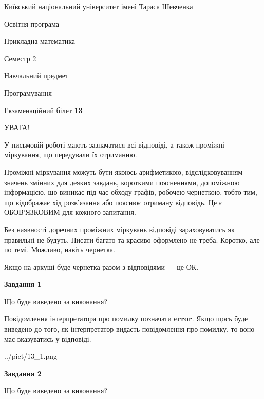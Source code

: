 \documentclass[12pt, ukrainian]{article}
\begin{document}
{{\begin {small}\par
{ \center  Київський національний університет імені Тараса Шевченка \par}
{\parbox {5 cm}{Освітня програма \hfill}{\parbox {7 cm}{Прикладна математика \hfill}}\parbox {6 cm}{\hfill Семестр 2}}\par
{\parbox {5 cm} {Навчальний предмет \hfill}\parbox {7 cm}{Програмування \hfill}\parbox {6cm}{\hfill}\par}\vspace{-7pt} \end{small}}{\center Екзаменаційний білет \No \textbf
{ 13 }\par}}
{
\begin {large}
УВАГА!

У письмовій роботі мають зазначатися всі відповіді, а також проміжні міркування, що передували їх отриманню.

Проміжні міркування можуть бути якоюсь арифметикою, відслідковуванням зна\-чень змінних для деяких завдань,
короткими поясненнями, допоміжною інформацією, що виникає під час обходу графів, робочею чернеткою,
тобто тим, що відображає хід розв’язання або пояснює отриману відповідь.
Це є ОБОВ’ЯЗКОВИМ для кожного запитання.

Без наявності доречних проміжних міркувань відповіді зараховуватись як правиль\-ні не будуть.
Писати багато та красиво оформлено не треба. Коротко, але по темі. Можли\-во, навіть чернетка.

Якщо на аркуші буде чернетка разом з відповідями --- це ОК.

\newpage

{\begin {center}\textbf{Завдання 1}\end {center}}\par
Що буде виведено за виконання?

Повідомлення інтерпретатора про помилку позначати \textbf{error}.
Якщо щось буде виведено до того, як інтерпретатор видасть повідомлення про помилку, 
то воно має вказуватись у відповіді. \par


\begin{center}
	{../pict/13_1.png}
\end{center}
\newpage

{\begin {center}\textbf{Завдання 2}\end {center}}\par
Що буде виведено за виконання?


\end{large}}
\end{document}
